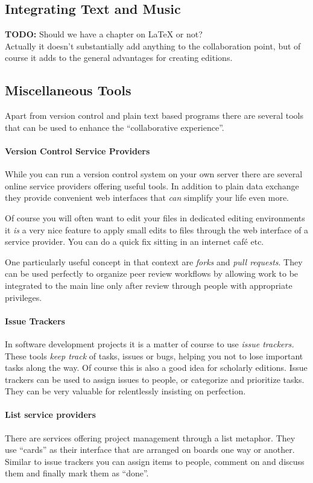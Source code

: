 \documentclass[11pt,a4paper]{article}
\begin{document}
\subsection{Integrating Text and Music}
\textbf{TODO:} Should we have a chapter on LaTeX or not?\\
Actually it doesn't substantially add anything to the collaboration point,
but of course it adds to the general advantages for creating editions.

\subsection{Miscellaneous Tools}
Apart from version control and plain text based programs there are several tools that
can be used to enhance the “collaborative experience”.

\paragraph{Version Control Service Providers}
While you can run a version control system on your own server there are several online service providers offering useful tools. In addition to plain data exchange they
provide convenient web interfaces that \emph{can} simplify your life even more.

Of course you will often want to edit your files in dedicated editing environments
it \emph{is} a very nice feature to apply small edits to files through the web interface
of a service provider. You can do a quick fix sitting in an internet café etc.

One particularly useful concept in that context are \emph{forks} and \emph{pull requests}.
They can be used perfectly to organize peer review workflows by allowing work to be
integrated to the main line only after review through people with appropriate privileges.

\paragraph{Issue Trackers}
In software development projects it is a matter of course to use \emph{issue trackers.}
These tools \emph{keep track} of tasks, issues or bugs, helping you not to lose important
tasks along the way. Of course this is also a good idea for scholarly editions. Issue
trackers can be used to assign issues to people, or categorize and prioritize tasks.
They can be very valuable for relentlessly insisting on perfection.

\paragraph{List service providers}
There are services offering project management through a list metaphor. They use “cards”
as their interface that are arranged on boards one way or another. Similar to issue trackers
you can assign items to people, comment on and discuss them and finally mark them as “done”.
\end{document}
